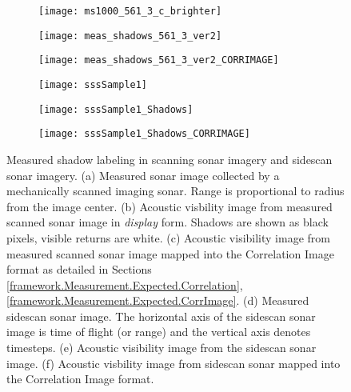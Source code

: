 \begin{figure}[!h]
  	\centering
	\begin{subfigure}[b]{0.28\textwidth}
                \texttt{[image: ms1000\_561\_3\_c\_brighter]}
                \caption{}
         \end{subfigure}
         \centering
	\begin{subfigure}[b]{0.28\textwidth}
                \texttt{[image: meas\_shadows\_561\_3\_ver2]}
                \caption{}
  	\end{subfigure}
  	\centering
	\begin{subfigure}[b]{0.4\textwidth}
                \texttt{[image: meas\_shadows\_561\_3\_ver2\_CORRIMAGE]}
                \caption{}
  	\end{subfigure}
  	
  	\centering
	\begin{subfigure}[b]{0.352\textwidth}
                \texttt{[image: sssSample1]}
                \caption{}
  	\end{subfigure}
  	\centering
	\begin{subfigure}[b]{0.352\textwidth}
                \texttt{[image: sssSample1\_Shadows]}
                \caption{}
  	\end{subfigure}	
  	\centering
	\begin{subfigure}[b]{0.24\textwidth}
                \texttt{[image: sssSample1\_Shadows\_CORRIMAGE]}
                \caption{}
  	\end{subfigure}
  	
	\caption{Measured shadow labeling in scanning sonar imagery and sidescan sonar imagery.  (a) Measured sonar image collected by a mechanically scanned imaging sonar. Range is proportional to radius from the image center. (b) Acoustic visbility image from measured scanned sonar image in \emph{display} form.  Shadows are shown as black pixels, visible returns are white. (c) Acoustic visibility image from measured scanned sonar image mapped into the Correlation Image format as detailed in Sections \ref{framework.Measurement.Expected.Correlation}, \ref{framework.Measurement.Expected.CorrImage}.  (d) Measured sidescan sonar image.  The horizontal axis of the sidescan sonar image is time of flight (or range) and the vertical axis denotes timesteps. (e) Acoustic visibility image from the sidescan sonar image. (f) Acoustic visbility image from sidescan sonar mapped into the Correlation Image format. }	
	\label{fig:shadowLabeling}
\end{figure}

